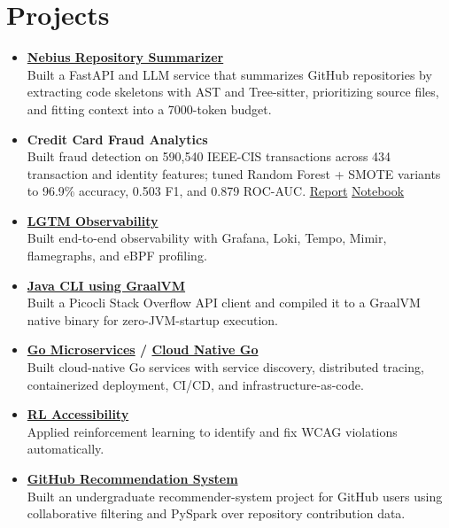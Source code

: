 \documentclass[10pt,a4paper]{article}
\newcommand{\project}[2]{%
  \item[] \textbf{\color{secondarycolor}#1}\\[-1pt]
  {#2}
}
\begin{document}
\section*{Projects}
\begin{itemize}
  \project{\href{https://github.com/aymanapatel/nebius-project}{Nebius Repository Summarizer}}{Built a FastAPI and LLM service that summarizes GitHub repositories by extracting code skeletons with AST and Tree-sitter, prioritizing source files, and fitting context into a 7000-token budget.}
  \project{Credit Card Fraud Analytics}{Built fraud detection on 590,540 IEEE-CIS transactions across 434 transaction and identity features; tuned Random Forest + SMOTE variants to 96.9\% accuracy, 0.503 F1, and 0.879 ROC-AUC. \href{https://github.com/aymanapatel/qmul-all-projects/blob/main/data-analytics/coursework1/credit-card-report.pdf}{Report} \textbar{} \href{https://github.com/aymanapatel/qmul-all-projects/blob/main/data-analytics/coursework1/credit-card-notebook.ipynb}{Notebook}}
  \project{\href{https://aymanace2049.hashnode.dev/grafana-one-observability-tool-to-rule-them-all}{LGTM Observability}}{Built end-to-end observability with Grafana, Loki, Tempo, Mimir, flamegraphs, and eBPF profiling.}
  \project{\href{https://github.com/aymanapatel/java-cli}{Java CLI using GraalVM}}{Built a Picocli Stack Overflow API client and compiled it to a GraalVM native binary for zero-JVM-startup execution.}
  \project{\href{https://github.com/aymanapatel/golang-microservices}{Go Microservices} / \href{https://github.com/aymanapatel/cloud-native-go}{Cloud Native Go}}{Built cloud-native Go services with service discovery, distributed tracing, containerized deployment, CI/CD, and infrastructure-as-code.}
  \project{\href{https://github.com/aymanapatel/rl-a11y}{RL Accessibility}}{Applied reinforcement learning to identify and fix WCAG violations automatically.}
  \project{\href{https://drive.google.com/file/d/1iKV_xFES7ByKqhxLe3ffbDuWSnKmVFsI/view?usp=sharing}{GitHub Recommendation System}}{Built an undergraduate recommender-system project for GitHub users using collaborative filtering and PySpark over repository contribution data.}
\end{itemize}
\end{document}
